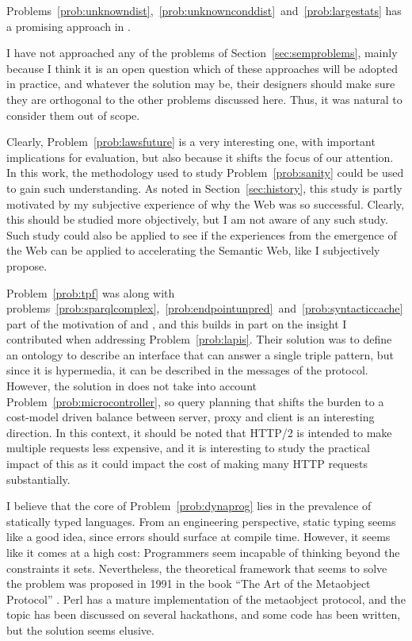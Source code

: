 Problems~\ref{prob:unknowndist},~\ref{prob:unknownconddist}~and~\ref{prob:largestats}
has a promising approach in \cite{5767868}. %

I have not approached any of the problems of
Section~\ref{sec:semproblems}, mainly because I think it is an open
question which of these approaches will be adopted in practice, and
whatever the solution may be, their designers should make sure they
are orthogonal to the other problems discussed here. Thus, it was
natural to consider them out of scope. 

Clearly, Problem~\ref{prob:lawsfuture} is a very interesting one, with
important implications for evaluation, but also because it shifts the
focus of our attention. In this work, the methodology used to study
Problem~\ref{prob:sanity} could be used to gain such understanding. As
noted in Section~\ref{sec:history}, this study is partly motivated by
my subjective experience of why the Web was so successful. Clearly,
this should be studied more objectively, but I am not aware of any
such study. Such study could also be applied to see if the experiences
from the emergence of the Web can be applied to accelerating the
Semantic Web, like I subjectively propose.

Problem~\ref{prob:tpf} was along with
problems~\ref{prob:sparqlcomplex},~\ref{prob:endpointunpred}~and~\ref{prob:syntacticcache}
part of the motivation of \cite{ldf1} and \cite{verborgh2014querying},
and this builds in part on the insight I contributed when addressing
Problem~\ref{prob:lapis}. Their solution was to define an ontology to
describe an interface that can answer a single triple pattern, but
since it is hypermedia, it can be described in the messages of the
protocol. However, the solution in \cite{verborgh2014querying} does
not take into account Problem~\ref{prob:microcontroller}, so query
planning that shifts the burden to a cost-model driven balance between
server, proxy and client is an interesting direction. In this context,
it should be noted that HTTP/2 \cite{rfc7540} is intended to make
multiple requests less expensive, and it is interesting to study the
practical impact of this as it could impact the cost of making many
HTTP requests substantially.

I believe that the core of Problem~\ref{prob:dynaprog} lies in the
prevalence of statically typed languages. From an engineering
perspective, static typing seems like a good idea, since errors should
surface at compile time. However, it seems like it comes at a high
cost: Programmers seem incapable of thinking beyond the constraints it
sets. Nevertheless, the theoretical framework that seems to solve the
problem was proposed in 1991 in the book ``The Art of the Metaobject
Protocol'' \cite{kiczales1991art}. Perl has a mature implementation of
the metaobject protocol, and the topic has been discussed on several
hackathons, and some code has been written, but the solution seems
elusive.

